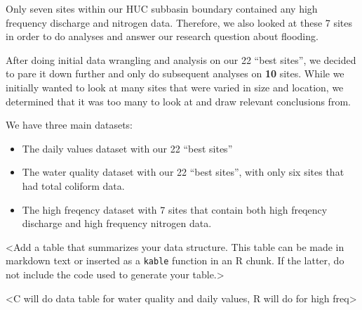 \documentclass[12pt,]{article}
\begin{document}
Only seven sites within our HUC subbasin boundary contained any high
frequency discharge and nitrogen data. Therefore, we also looked at
these 7 sites in order to do analyses and answer our research question
about flooding.

After doing initial data wrangling and analysis on our 22 ``best
sites'', we decided to pare it down further and only do subsequent
analyses on \textbf{10} sites. While we initially wanted to look at many
sites that were varied in size and location, we determined that it was
too many to look at and draw relevant conclusions from.

We have three main datasets:

\begin{itemize}
\item
  The daily values dataset with our 22 ``best sites''
\item
  The water quality dataset with our 22 ``best sites'', with only six
  sites that had total coliform data.
\item
  The high freqency dataset with 7 sites that contain both high freqency
  discharge and high frequency nitrogen data.
\end{itemize}

\textless Add a table that summarizes your data structure. This table
can be made in markdown text or inserted as a \texttt{kable} function in
an R chunk. If the latter, do not include the code used to generate your
table.\textgreater{}

\textless C will do data table for water quality and daily values, R
will do for high freq\textgreater{}
\end{document}
